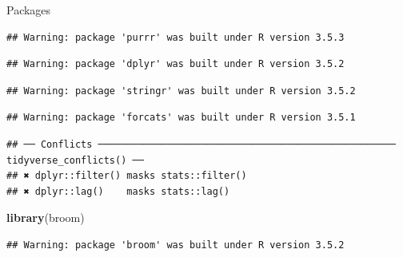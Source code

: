 \documentclass[ignorenonframetext,]{beamer}
\newenvironment{Shaded}{\begin{snugshade}}{\end{snugshade}}
\newcommand{\KeywordTok}[1]{\textcolor[rgb]{0.13,0.29,0.53}{\textbf{#1}}}
\newcommand{\NormalTok}[1]{#1}
\begin{document}
\begin{frame}[fragile]{Packages}
\begin{verbatim}
## Warning: package 'purrr' was built under R version 3.5.3
\end{verbatim}

\begin{verbatim}
## Warning: package 'dplyr' was built under R version 3.5.2
\end{verbatim}

\begin{verbatim}
## Warning: package 'stringr' was built under R version 3.5.2
\end{verbatim}

\begin{verbatim}
## Warning: package 'forcats' was built under R version 3.5.1
\end{verbatim}

\begin{verbatim}
## ── Conflicts ──────────────────────────────────────────────────── tidyverse_conflicts() ──
## ✖ dplyr::filter() masks stats::filter()
## ✖ dplyr::lag()    masks stats::lag()
\end{verbatim}

\begin{Shaded}
\begin{Highlighting}[]
\KeywordTok{library}\NormalTok{(broom)}
\end{Highlighting}
\end{Shaded}

\begin{verbatim}
## Warning: package 'broom' was built under R version 3.5.2
\end{verbatim}

\end{frame}
\end{document}
